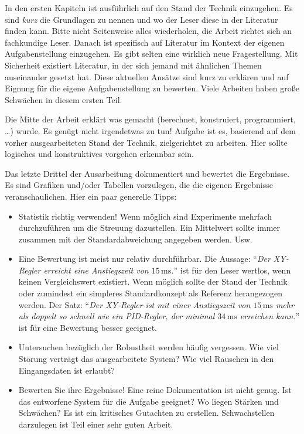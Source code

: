 In den ersten Kapiteln ist ausführlich auf den Stand der Technik einzugehen. Es sind \emph{kurz} die Grundlagen zu nennen und wo der Leser diese in der Literatur finden kann. Bitte nicht Seitenweise alles wiederholen, die Arbeit richtet sich an fachkundige Leser. Danach ist spezifisch auf Literatur im Kontext der eigenen Aufgabenstellung einzugehen. Es gibt selten eine wirklich neue Fragestellung. Mit Sicherheit existiert Literatur, in der sich jemand mit ähnlichen Themen auseinander gesetzt hat. Diese aktuellen Ansätze sind kurz zu erklären und auf Eignung für die eigene Aufgabenstellung zu bewerten. Viele Arbeiten haben große Schwächen in diesem ersten Teil.

Die Mitte der Arbeit erklärt was gemacht (berechnet, konstruiert, programmiert, \ldots) wurde. Es genügt nicht irgendetwas zu tun! Aufgabe ist es, basierend auf dem vorher ausgearbeiteten Stand der Technik, zielgerichtet zu arbeiten. Hier sollte logisches und konstruktives vorgehen erkennbar sein.

Das letzte Drittel der Ausarbeitung dokumentiert und bewertet die Ergebnisse. Es sind Grafiken und/oder Tabellen vorzulegen, die die eigenen Ergebnisse veranschaulichen. Hier ein paar generelle Tipps:

\begin{itemize}
	\item Statistik richtig verwenden! Wenn möglich sind Experimente mehrfach durchzuführen um die Streuung dazustellen. Ein Mittelwert sollte immer zusammen mit der Standardabweichung angegeben werden. Usw.
	\item Eine Bewertung ist meist nur relativ durchführbar. Die Aussage: "`\emph{Der XY-Regler erreicht eine Anstiegszeit von $15\,\mathrm{ms}$.}"' ist für den Leser wertlos, wenn keinen Vergleichswert existiert. Wenn möglich sollte der Stand der Technik oder zumindest ein simpleres Standardkonzept als Referenz herangezogen werden. Der Satz: "`\emph{Der XY-Regler ist mit einer Anstiegszeit von $15\,\mathrm{ms}$ mehr als doppelt so schnell wie ein PID-Regler, der minimal $34\,\mathrm{ms}$ erreichen kann.}"' ist für eine Bewertung besser geeignet.
	\item Untersuchen bezüglich der Robustheit werden häufig vergessen. Wie viel Störung verträgt das ausgearbeitete System? Wie viel Rauschen in den Eingangsdaten ist erlaubt?
	\item Bewerten Sie ihre Ergebnisse! Eine reine Dokumentation ist nicht genug. Ist das entworfene System für die Aufgabe geeignet? Wo liegen Stärken und Schwächen? Es ist ein kritisches Gutachten zu erstellen. Schwachstellen darzulegen ist Teil einer sehr guten Arbeit. 
\end{itemize}

